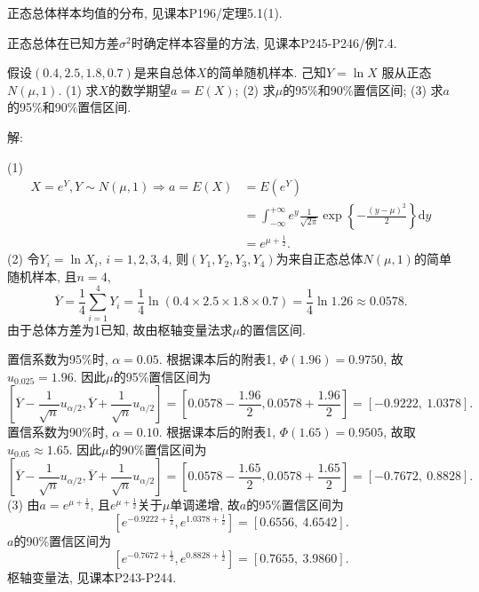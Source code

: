 \documentclass[standard]{ExBook}
\renewenvironment{shaded}{%
  \def\FrameCommand{\fboxsep=\FrameSep \colorbox{shadecolor}}%
  \MakeFramed{\advance\hsize-\width \FrameRestore}%
}{%
  \endMakeFramed
}
\begin{document}
\begin{qitems}
\textcolor{themeColor}{\selectfont {} 正态总体样本均值的分布, 见课本P196/定理5.1(1).}

\textcolor{themeColor}{\selectfont {} 正态总体在已知方差$\sigma^2$时确定样本容量的方法, 见课本P245-P246/例7.4.}

\vspace{2.5cm-5em}

    \begin{bbox}
    \begin{shaded}
        \qitem
假设$(0.4,2.5,1.8,0.7)$是来自总体$X$的简单随机样本. 己知$Y = \ln X$ 服从正态$N(\mu,1)$.
(1) 求$X$的数学期望$a = E(X)$;
(2) 求$\mu$的95\%和90\%置信区间;
(3) 求$a$的95\%和90\%置信区间.
    \end{shaded}
    \end{bbox}

\vspace{\dimexpr2.5cm-5em\relax}

解:

(1)
$$
\begin{aligned}
X=e^Y, Y\sim N(\mu,1)
\Longrightarrow
a=E(X)
&=E(e^Y)\\
&=\int_{-\infty}^{+\infty}
e^y\frac{1}{\sqrt{2\pi}}
\exp\left\{-\frac{(y-\mu)^2}{2}\right\}\mathrm{d}y\\
&=e^{\mu+\frac{1}{2}}.
\end{aligned}
$$
(2) 令$Y_i=\ln X_i$, $i=1,2,3,4$, 则$(Y_1,Y_2,Y_3,Y_4)$为来自正态总体$N(\mu,1)$的简单随机样本, 且$n=4$,
$$
\overline{Y}
=\frac{1}{4}\sum_{i=1}^{4}Y_i
=\frac{1}{4}\ln(0.4\times2.5\times1.8\times0.7)
=\frac{1}{4}\ln1.26
\approx0.0578.
$$
由于总体方差为1已知, 故由枢轴变量法求$\mu$的置信区间.

置信系数为95\%时, $\alpha=0.05$. 根据课本后的附表1, $\Phi(1.96)=0.9750$, 故$u_{0.025}=1.96$. 因此$\mu$的95\%置信区间为
$$
\left[
\overline{Y}-\frac{1}{\sqrt{n}}u_{\alpha/2},
\overline{Y}+\frac{1}{\sqrt{n}}u_{\alpha/2}
\right]
=
\left[
0.0578-\frac{1.96}{2},
0.0578+\frac{1.96}{2}
\right]
=
[-0.9222,\ 1.0378].
$$
置信系数为90\%时, $\alpha=0.10$. 根据课本后的附表1, $\Phi(1.65)=0.9505$, 故取$u_{0.05}\approx1.65$. 因此$\mu$的90\%置信区间为
$$
\left[
\overline{Y}-\frac{1}{\sqrt{n}}u_{\alpha/2},
\overline{Y}+\frac{1}{\sqrt{n}}u_{\alpha/2}
\right]
=
\left[
0.0578-\frac{1.65}{2},
0.0578+\frac{1.65}{2}
\right]
=
[-0.7672,\ 0.8828].
$$
(3) 由$a=e^{\mu+\frac{1}{2}}$, 且$e^{\mu+\frac{1}{2}}$关于$\mu$单调递增, 故$a$的95\%置信区间为
$$
\left[
e^{-0.9222+\frac{1}{2}},
e^{1.0378+\frac{1}{2}}
\right]
=
[0.6556,\ 4.6542].
$$
$a$的90\%置信区间为
$$
\left[
e^{-0.7672+\frac{1}{2}},
e^{0.8828+\frac{1}{2}}
\right]
=
[0.7655,\ 3.9860].
$$
\textcolor{themeColor}{\selectfont {} 枢轴变量法, 见课本P243-P244.}


\end{qitems}
\end{document}
